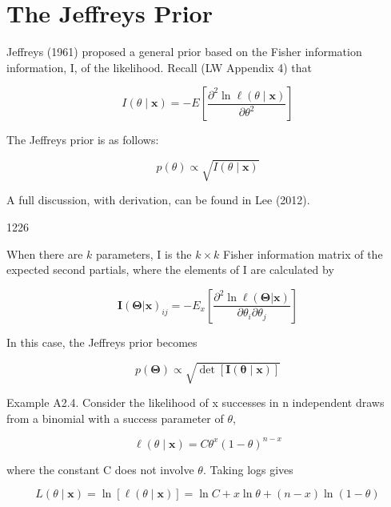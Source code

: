 \documentclass{article}
\begin{document}
\section{The Jeffreys Prior}
Jeffreys (1961) proposed a general prior based on the Fisher information information, I, of the likelihood. Recall (LW Appendix 4) that

\begin{equation}
I(\theta\mid\mathbf{x})=-E\left[\frac{\partial^{2}\ln\ell(\theta\mid\mathbf{x})}{\partial\theta^{2}}\right]
\end{equation}

The Jeffreys prior is as follows:

\begin{equation}
p(\theta)\propto\sqrt{I(\theta\mid\mathbf{x})}
\end{equation}

A full discussion, with derivation, can be found in Lee (2012).

1226

When there are  $ k $ parameters, I is the  $ k \times k $ Fisher information matrix of the expected second partials, where the elements of I are calculated by

\begin{equation}
\mathbf{I}(\boldsymbol{\Theta}|\mathbf{x})_{i j}=-E_{x}\left[\frac{\partial^{2}\ln\ell(\boldsymbol{\Theta}|\mathbf{x})}{\partial\theta_{i}\partial\theta_{j}}\right]
\end{equation}

In this case, the Jeffreys prior becomes

\begin{equation}
p(\boldsymbol{\Theta})\propto\sqrt{\det[\mathbf{I}(\boldsymbol{\theta}\mid\mathbf{x})]}
\end{equation}

Example A2.4. Consider the likelihood of x successes in n independent draws from a binomial with a success parameter of  $ \theta $,

\begin{equation}
\ell(\theta\mid\mathbf{x})=C\theta^{x}(1-\theta)^{n-x}
\end{equation}

where the constant C does not involve  $ \theta $. Taking logs gives

\begin{equation}
L(\theta\mid\mathbf{x})=\ln\left[\ell(\theta\mid\mathbf{x})\right]=\ln C+x\ln\theta+(n-x)\ln(1-\theta)
\end{equation}
\end{document}

